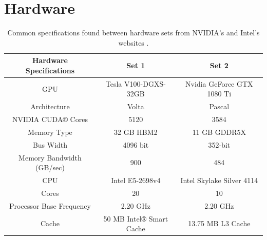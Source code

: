 \documentclass[review]{elsarticle}
\def\oldCPU{s}
\def\oldGPU{s}
\def\newCPU{s}
\def\newGPU{s}
\def\Swept{\texttt{Swept}}
\def\Standard{\texttt{Standard}}
\def\oldCPU{Intel Skylake Silver 4114} %
\def\oldGPU{Nvidia GeForce GTX 1080 Ti}
\def\newCPU{Intel E5-2698v4} %
\def\newGPU{Tesla V100-DGXS-32GB}
\begin{document}
\section{Hardware}
\label{Hardware}
\begin{table}[htb!]
\begin{center}
\begin{tabular}{ |c|c|c| } 

 \hline
 Hardware Specifications & Set 1 & Set 2 \\
 \hline
 GPU & \newGPU{} & \oldGPU{} \\
 Architecture   & Volta &  Pascal \\
 NVIDIA CUDA® Cores  & 5120 &  3584 \\
 Memory Type   & 32 GB HBM2 &  11 GB GDDR5X \\
 Bus Width    & 4096 bit &  352-bit \\
 Memory Bandwidth (GB/sec)  & 900 &  484 \\ 
 \hline
 CPU & \newCPU{} & \oldCPU{} \\ 
 Cores & 20 & 10 \\
 Processor Base Frequency & 2.20 GHz & 2.20 GHz \\
 Cache & 50 MB Intel® Smart Cache & 13.75 MB L3 Cache\\
 \hline
\end{tabular}
\end{center}
\caption{\label{hardwareTable} Common specifications found between hardware sets from NVIDIA's and Intel's websites \cite{Intel123550,Intel91753,NVIDIANVIDIA,GeForceGeForce}.}
\end{table}


\end{document}
